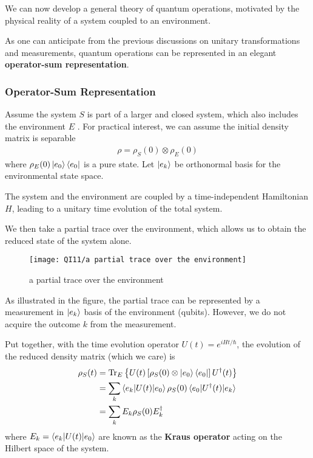 We can now develop a general theory of quantum operations, motivated by the physical reality of a system coupled to an environment. 

As one can anticipate from the previous discussions on unitary transformations and measurements, quantum operations can be represented in an elegant \textbf{operator-sum representation}.

\subsubsection{Operator-Sum Representation}
Assume the system $S$ is part of a larger and closed system, which also includes the environment $E$ . For practical interest, we can assume the initial density matrix is separable
\begin{align*}
    \rho=\rho_S(0)\otimes\rho_E(0)
\end{align*}
where $\rho_E(0)\ket{e_0}\bra{e_0}$ is a pure state. Let $\ket{e_k}$ be orthonormal basis for the environmental state space. 

The system and the environment are coupled by a time-independent Hamiltonian $H$, leading to a unitary time evolution of the total system.

We then take a partial trace over the environment, which allows us to obtain the reduced state of the system alone.

\begin{figure}[!htb]
    \centering
    \texttt{[image: QI11/a partial trace over the environment]}
    \caption{a partial trace over the environment}
\end{figure}

As illustrated in the figure, the partial trace can be represented by a measurement in $\ket{e_k}$ basis of the environment (qubits). However, we do not acquire the outcome $k$ from the measurement.

Put together, with the time evolution operator $U(t)=e^{iHt/\hbar}$, the evolution of the reduced density matrix (which we care) is
\begin{align*}
    \rho_S(t)&=\mathrm{Tr}_E\left\{ U(t)\left[ \rho_S(0)\otimes \ket{e_0}\bra{e_0} \right] U^\dagger (t) \right\}\\
    &=\sum_k \braket{e_k | U(t) | e_0}\rho_S(0)\braket{e_0| U^\dagger(t) |e_k}\\
    &=\sum_k E_k \rho_S(0)E_k^\dagger
\end{align*}
where $E_k=\braket{e_k| U(t) |e_0}$ are known as the \textbf{Kraus operator} acting on the Hilbert space of the system. 

